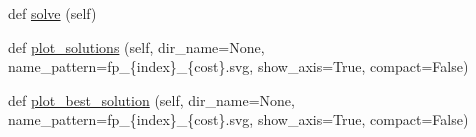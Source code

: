 \begin{DoxyCompactItemize}
\item 
def \hyperlink{classsylva_1_1code__generation_1_1floorplanner_1_1floorplanner_afcbeb4bd85098dad8b4fe2f822b67328}{solve} (self)
\item 
def \hyperlink{classsylva_1_1code__generation_1_1floorplanner_1_1floorplanner_a9a77944b379401d7be62164312b29721}{plot\+\_\+solutions} (self, dir\+\_\+name=None, name\+\_\+pattern=\textquotesingle{}fp\+\_\+\{index\}\+\_\+\{cost\}.svg\textquotesingle{}, show\+\_\+axis=True, compact=False)
\item 
def \hyperlink{classsylva_1_1code__generation_1_1floorplanner_1_1floorplanner_a34a19dab41b1f0c2eb39a527b05e26e0}{plot\+\_\+best\+\_\+solution} (self, dir\+\_\+name=None, name\+\_\+pattern=\textquotesingle{}fp\+\_\+\{index\}\+\_\+\{cost\}.svg\textquotesingle{}, show\+\_\+axis=True, compact=False)
\end{DoxyCompactItemize}
